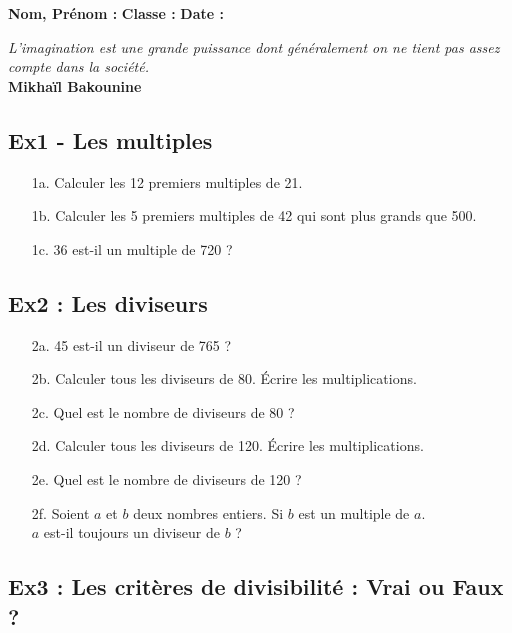 



\textbf{Nom, Prénom :} \hspace{8cm} \textbf{Classe :} \hspace{3cm} \textbf{Date :}\\

\begin{center}
  \textit{L’imagination est une grande puissance dont généralement on ne tient pas assez compte dans la société.} \\ 
  \textbf{Mikhaïl Bakounine}
\end{center}

\subsection*{Ex1 - Les multiples}

\begin{enumerate}
  \item[1a.] Calculer les 12 premiers multiples de 21.
  \item[1b.] Calculer les 5 premiers multiples de 42 qui sont plus grands que 500.
  \item[1c.] 36 est-il un multiple de 720 ?
\end{enumerate}

\subsection*{Ex2 : Les diviseurs}

\begin{enumerate}
  \item[2a.] 45 est-il un diviseur de 765 ?
  \item[2b.] Calculer tous les diviseurs de 80. Écrire les multiplications. 
  \item[2c.] Quel est le nombre de diviseurs de 80 ?
  \item[2d.] Calculer tous les diviseurs de 120. Écrire les multiplications. 
  \item[2e.] Quel est le nombre de diviseurs de 120 ?
  \item[2f.] Soient $a$ et $b$ deux nombres entiers. Si $b$ est un multiple de $a$. \\
   $a$ est-il toujours un diviseur de $b$ ?
\end{enumerate}

\subsection*{Ex3 : Les critères de divisibilité : Vrai ou Faux ?}

